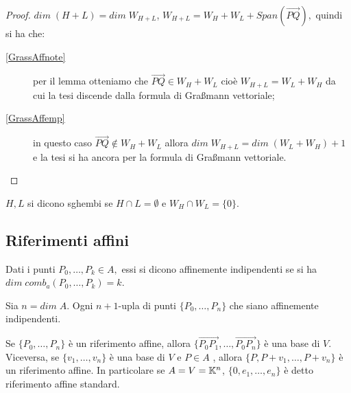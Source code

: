 \documentclass[a4paper,12pt]{article}
\newcommand{\Got}[1]{#1}
\newcommand{\got}[1]{{#1}}
\newcommand{\vet}[1]{\overrightarrow{#1}}
\begin{document}
 \begin{proof}
 \Got{} $\got{dim\;(H+L)= dim\;W_{H+L}}$, $\got{W_{H+L}=W_H+W_L+Span(\vet{PQ})},$ \Got{quindi si ha che:}
 \begin{description}
	\item[\ref{GrassAffnote}] \Got{per il lemma otteniamo che} $\got{\vet{PQ}\in W_H+W_L}$ \Got{cioè} $\got{W_{H+L}=W_L+W_H}$
		\Got{da cui la tesi discende dalla formula di Gra\ss mann vettoriale;}
	\item[\ref{GrassAffemp}] \Got{in questo caso} $\got{\vet{PQ}\notin W_H+W_L}$ \Got{allora} $\got{dim\;W_{H+L}=dim\;(W_L+W_H)+1}$
		\Got{e la tesi si ha ancora per la formula di Gra\ss mann vettoriale.}
 \end{description}
 \end{proof}

 \begin{definition}
 \Got{} $\got{H,L}$ \Got{si dicono sghembi se } $\got{H\cap L = \emptyset}$ \Got{e} $\got{W_H \cap W_L = \{0\}}$.
 \end{definition}
 
	\subsection{Riferimenti affini}
 
 \begin{definition}
 \Got{Dati i punti} $\got{P_0,\dots, P_k\in A,}$ \Got{essi si dicono affinemente indipendenti se si ha}
 $\got{dim\;comb_a(P_0,\dots,P_k)=k}$.
 \end{definition}
 
 \begin{definition}
 \Got{Sia} $\got{n=dim\;A}$. \Got{Ogni} $\got{n+1}$\Got{-upla di punti} $\got{\{P_0,\dots, P_n\}}$
 \Got{che siano affinemente indipendenti.}
 \end{definition}
 
 \begin{remark}
 \Got{Se} $\got{\{P_0,\dots, P_n\}}$ \Got{è un riferimento affine, allora}
 $\got{\{\vet{P_0P_1},\dots,\vet{P_0P_n}\}}$ \Got{è una base di} $\got{V}$. \Got{Viceversa, se} $\got{\{v_1,\dots,v_n\}}$ \Got{è una base di}
 $\got{V}$ \Got{e} $\got{P\in A}$ \Got{, allora} $\got{\{P,P+v_1,\dots,P+v_n\}}$ \Got{è un riferimento affine. In particolare se}
 $\got{A=V=\K^n}$, $\got{\{0,e_1,\dots,e_n\}}$ \Got{è detto riferimento affine standard.}
 \end{remark}
 
\end{document}
